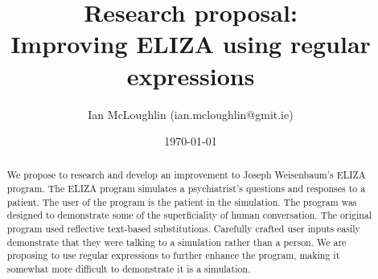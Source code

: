 

\title{Research proposal: \\ Improving ELIZA using regular expressions}
\author{Ian McLoughlin (ian.mcloughlin@gmit.ie)}
\date{\today}




  \maketitle

  \begin{abstract}
    We propose to research and develop an improvement to Joseph Weisenbaum's
    ELIZA program. The ELIZA program simulates a psychiatrist's questions and
    responses to a patient. The user of the program is the patient in the
    simulation. The program was designed to demonstrate some of the
    superficiality of human conversation. The original program used
    reflective text-based substitutions. Carefully crafted user inputs
    easily demonstrate that they were talking to a simulation rather than a
    person. We are proposing to use regular expressions to further enhance the
    program, making it somewhat more difficult to demonstrate it is a
    simulation.
  \end{abstract}

